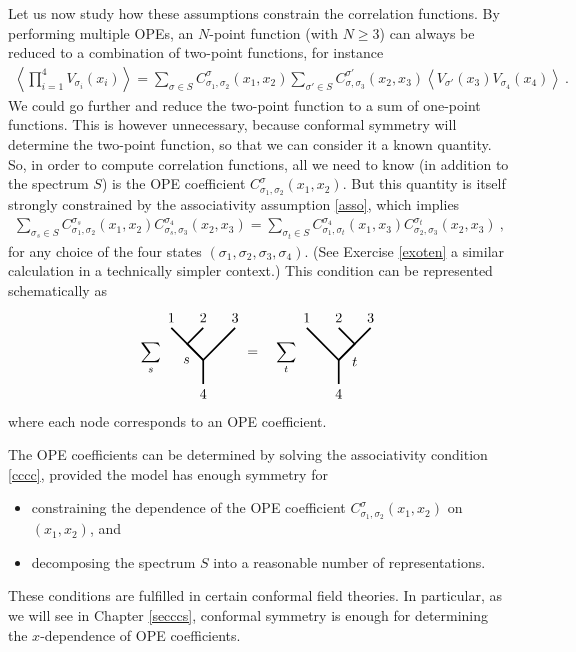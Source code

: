 \documentclass[12pt, a4paper, notitlepage, twoside]{report}
\numberwithin{equation}{section}
\theoremstyle{break}
\begin{document}
Let us now study how these assumptions constrain the correlation functions.
By performing multiple OPEs, an $N$-point function (with $N\geq 3$) can always be reduced to a combination of two-point functions, for instance
\begin{align}
 \left\langle \prod_{i=1}^4 V_{\sigma_i}(x_i) \right\rangle = \sum_{\sigma\in S} C_{\sigma_1,\sigma_2}^{\sigma}(x_1,x_2)\sum_{\sigma'\in S} C_{\sigma,\sigma_3}^{\sigma'}(x_2,x_3)\left\langle V_{\sigma'}(x_3)V_{\sigma_4}(x_4)\right\rangle\ .
\end{align}
We could go further and reduce the two-point function to a sum of one-point functions.
This is however unnecessary, because conformal symmetry will determine the two-point function, so that we can consider it a known quantity.
So, in order to compute correlation functions, all we need to know (in addition to the spectrum $S$) is the OPE coefficient $C_{\sigma_1,\sigma_2}^{\sigma}(x_1,x_2)$.
But this quantity is itself strongly constrained by the associativity assumption \eqref{asso}, which implies
\begin{align}
 \sum_{\sigma_s\in S} C_{\sigma_1,\sigma_2}^{\sigma_s}(x_1,x_2) C_{\sigma_s,\sigma_3}^{\sigma_4}(x_2,x_3) = \sum_{\sigma_t\in S} C_{\sigma_1,\sigma_t}^{\sigma_4}(x_1,x_3)C_{\sigma_2,\sigma_3}^{\sigma_t}(x_2,x_3)\ ,
\label{cccc}
\end{align}
for any choice of the four states $(\sigma_1,\sigma_2,\sigma_3,\sigma_4)$.
(See Exercise \ref{exoten} a similar calculation in a technically simpler context.) This condition can be represented schematically as 
\begin{align}
\sum_{s} 
 \begin{tikzpicture}[scale = .2, baseline=(current  bounding  box.center), very thick]
  \draw (-4,3) node [above] {$1$} -- (0, -1) -- (4, 3) node [above] {$3$};
  \draw (0, 3) node [above] {$2$} -- (-2, 1) -- node [below left] {$s$} (0, -1) -- (0, -4) node [below] {$4$};
 \end{tikzpicture}
= \quad
\sum_{t} 
\begin{tikzpicture}[scale = .2, baseline=(current  bounding  box.center), very thick]
  \draw (-4,3) node [above] {$1$} -- (0, -1) -- (4, 3) node [above] {$3$};
  \draw (0, 3) node [above] {$2$} -- (2, 1) -- node [below right] {$t$} (0, -1) -- (0, -4) node [below] {$4$};
  \end{tikzpicture}
\label{sdsd}
\end{align}
where each node corresponds to an OPE coefficient. 

The OPE coefficients can be determined by solving the associativity condition \eqref{cccc}, provided the model has enough symmetry for 
\begin{itemize}
 \item constraining the dependence of the OPE coefficient $C_{\sigma_1,\sigma_2}^{\sigma}(x_1,x_2)$ on $(x_1,x_2)$, and
\item decomposing the spectrum $S$ into a reasonable number of representations.
\end{itemize}
These conditions are fulfilled in certain conformal field theories.
In particular, as we will see in Chapter \ref{secccs}, conformal symmetry is enough for determining the $x$-dependence of OPE coefficients. 
\end{document}
